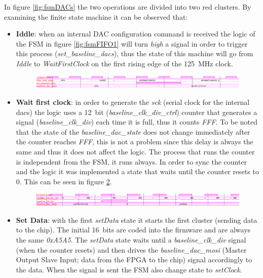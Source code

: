 In figure \ref{fig:fsmDACs} the two operations are divided into two red clusters.
By examining the finite state machine it can be observed that:
\begin{itemize}
	\item \textbf{Iddle}: when an internal DAC configuration command is received the logic of the FSM in figure \ref{fig:fsmFIFO1} will turn \textit{high} a signal in order to trigger this process (\textit{set\_baseline\_dacs}), thus the state of this machine will go from \textit{Iddle} to \textit{WaitFirstClock} on the first rising edge of the 125~MHz clock.
	\begin{figure}[H]
		\centering
		\includegraphics[width=1.0\linewidth]{IMG/ch4/DACsimulations/FSMiddle}
		\caption{}
		\label{fig:fsmiddle}
	\end{figure} 
	\item \textbf{Wait first clock}: in order to generate the \textit{sck} (serial clock for the internal dacs) the logic uses a 12~bit (\textit{baseline\_clk\_div\_ctrl}) counter that generates a signal (\textit{baseline\_clk\_div}) each time it is full, thus it counts \textit{FFF}.
	\newline To be noted that the state of the \textit{baseline\_dac\_state} does not change immediately after the counter reaches \textit{FFF}, this is not a problem since this delay is always the same and thus it does not affect the logic.
	\newline The process that runs the counter is independent from the FSM, it runs always. In order to sync the counter and the logic it was implemented a state that waits until the counter resets to 0. This can be seen in figure \ref{fig:fsmwaitfirstclock}. 
	\begin{figure}[H]
		\centering
		\includegraphics[width=1.0\linewidth]{IMG/ch4/DACsimulations/FSMwaitfirstclock}
		\caption{}
		\label{fig:fsmwaitfirstclock}
	\end{figure}
	\item \textbf{Set Data}: with the first \textit{setData} state it starts the first cluster (sending data to the chip). The initial 16~bits are coded into the firmware and are always the same \textit{0xA5A5}.
	The \textit{setData} state waits until a \textit{baseline\_clk\_div} signal (when the counter resets) and then drives the \textit{baseline\_dac\_mosi} (Master Output Slave Input; data from the FPGA to the chip) signal accordingly to the data. When the signal is sent the FSM also change state to \textit{setClock}.

\end{itemize}
